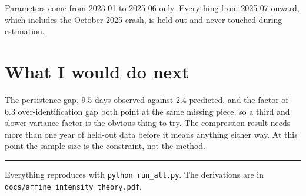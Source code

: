\documentclass[11pt]{article}
\newcommand{\code}[1]{\texttt{\small #1}}
\begin{document}
Parameters come from 2023-01 to 2025-06 only. Everything from 2025-07 onward,
which includes the October 2025 crash, is held out and never touched during
estimation.

\section{What I would do next}

The persistence gap, 9.5 days observed against 2.4 predicted, and the
factor-of-6.3 over-identification gap both point at the same missing piece, so a
third and slower variance factor is the obvious thing to try. The compression
result needs more than one year of held-out data before it means anything either
way. At this point the sample size is the constraint, not the method.

\vspace{8pt}\hrule\vspace{6pt}
{\small\color{muted}
Everything reproduces with \code{python run\_all.py}. The derivations are in
\code{docs/affine\_intensity\_theory.pdf}.}
\end{document}
